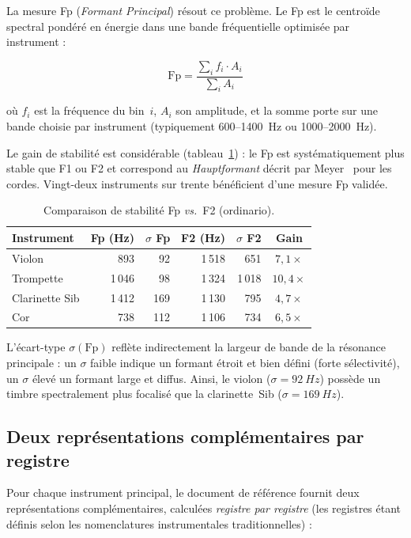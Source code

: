 \documentclass[11pt,a4paper]{article}
\begin{document}
La mesure Fp (\emph{Formant Principal}) résout ce problème. Le Fp est le
centroïde spectral pondéré en énergie dans une bande fréquentielle
optimisée par instrument :

\begin{equation}
  \mathrm{Fp} = \frac{\sum_i f_i \cdot A_i}{\sum_i A_i}
  \label{eq:fp}
\end{equation}

\noindent où $f_i$ est la fréquence du bin~$i$, $A_i$ son amplitude, et
la somme porte sur une bande choisie par instrument (typiquement
600--\SI{1400}{Hz} ou 1000--\SI{2000}{Hz}).

Le gain de stabilité est considérable
(tableau~\ref{tab:fp-stability}) : le Fp est systématiquement plus
stable que F1 ou F2 et correspond au \emph{Hauptformant} décrit par
Meyer~\cite{meyer2009} pour les cordes. Vingt-deux instruments sur
trente bénéficient d'une mesure Fp validée.

\begin{table}[ht]
\centering
\caption{Comparaison de stabilité Fp \emph{vs.}\ F2 (ordinario).}
\label{tab:fp-stability}
\begin{tabular}{lrrrrc}
\toprule
Instrument & Fp (Hz) & $\sigma$ Fp & F2 (Hz) & $\sigma$ F2 & Gain \\
\midrule
Violon         & 893  &  92 & 1\,518 & 651  & $7{,}1\times$ \\
Trompette      & 1\,046 &  98 & 1\,324 & 1\,018 & $10{,}4\times$ \\
Clarinette Sib & 1\,412 & 169 & 1\,130 & 795  & $4{,}7\times$ \\
Cor            & 738  & 112 & 1\,106 & 734  & $6{,}5\times$ \\
\bottomrule
\end{tabular}
\end{table}

L'écart-type $\sigma(\mathrm{Fp})$ reflète indirectement la largeur de
bande de la résonance principale : un $\sigma$ faible indique un formant
étroit et bien défini (forte sélectivité), un $\sigma$ élevé un formant
large et diffus. Ainsi, le violon ($\sigma = \SI{92}{Hz}$) possède un
timbre spectralement plus focalisé que la clarinette~Sib ($\sigma =
\SI{169}{Hz}$).

\subsection{Deux représentations complémentaires par registre}

Pour chaque instrument principal, le document de référence fournit deux
représentations complémentaires, calculées \emph{registre par registre}
(les registres étant définis selon les nomenclatures instrumentales
traditionnelles) :
\end{document}
